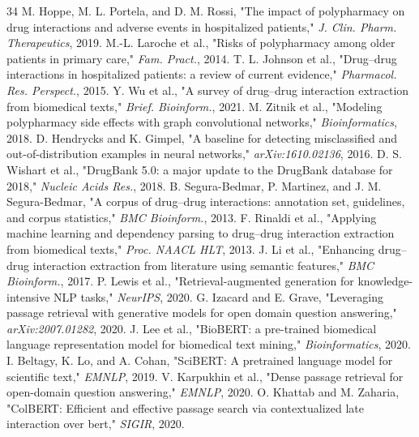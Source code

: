 \documentclass[conference]{IEEEtran}
\begin{document}
\begin{thebibliography}{34}
M. Hoppe, M. L. Portela, and D. M. Rossi, "The impact of polypharmacy on drug interactions and adverse events in hospitalized patients," \emph{J. Clin. Pharm. Therapeutics}, 2019.
M.-L. Laroche et al., "Risks of polypharmacy among older patients in primary care," \emph{Fam. Pract.}, 2014.
T. L. Johnson et al., "Drug--drug interactions in hospitalized patients: a review of current evidence," \emph{Pharmacol. Res. Perspect.}, 2015.
Y. Wu et al., "A survey of drug--drug interaction extraction from biomedical texts," \emph{Brief. Bioinform.}, 2021.
M. Zitnik et al., "Modeling polypharmacy side effects with graph convolutional networks," \emph{Bioinformatics}, 2018.
D. Hendrycks and K. Gimpel, "A baseline for detecting misclassified and out-of-distribution examples in neural networks," \emph{arXiv:1610.02136}, 2016.
D. S. Wishart et al., "DrugBank 5.0: a major update to the DrugBank database for 2018," \emph{Nucleic Acids Res.}, 2018.
B. Segura-Bedmar, P. Martinez, and J. M. Segura-Bedmar, "A corpus of drug--drug interactions: annotation set, guidelines, and corpus statistics," \emph{BMC Bioinform.}, 2013.
F. Rinaldi et al., "Applying machine learning and dependency parsing to drug--drug interaction extraction from biomedical texts," \emph{Proc. NAACL HLT}, 2013.
J. Li et al., "Enhancing drug--drug interaction extraction from literature using semantic features," \emph{BMC Bioinform.}, 2017.
P. Lewis et al., "Retrieval-augmented generation for knowledge-intensive NLP tasks," \emph{NeurIPS}, 2020.
G. Izacard and E. Grave, "Leveraging passage retrieval with generative models for open domain question answering," \emph{arXiv:2007.01282}, 2020.
J. Lee et al., "BioBERT: a pre-trained biomedical language representation model for biomedical text mining," \emph{Bioinformatics}, 2020.
I. Beltagy, K. Lo, and A. Cohan, "SciBERT: A pretrained language model for scientific text," \emph{EMNLP}, 2019.
V. Karpukhin et al., "Dense passage retrieval for open-domain question answering," \emph{EMNLP}, 2020.
O. Khattab and M. Zaharia, "ColBERT: Efficient and effective passage search via contextualized late interaction over bert," \emph{SIGIR}, 2020.

\end{thebibliography}
\end{document}
